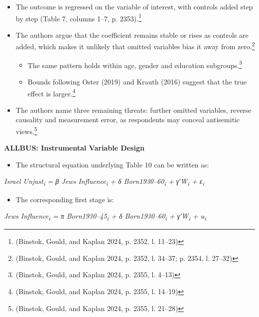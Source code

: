 \begin{itemize}
\item
  The outcome is regressed on the variable of interest, with controls added step by step (Table 7, columns 1--7, p. 2353).\footnote{(Binstok, Gould, and Kaplan 2024, p. 2352, l. 11--23)}
\item
  The authors argue that the coefficient remains stable or rises as controls are added, which makes it unlikely that omitted variables bias it away from zero.\footnote{(Binstok, Gould, and Kaplan 2024, p. 2352, l. 34--37; p. 2354, l. 27--32)}

  \begin{itemize}
  \item
    The same pattern holds within age, gender and education subgroups.\footnote{(Binstok, Gould, and Kaplan 2024, p. 2355, l. 4--13)}
  \item
    Bounds following Oster (2019) and Krauth (2016) suggest that the true effect is larger.\footnote{(Binstok, Gould, and Kaplan 2024, p. 2355, l. 14--19)}
  \end{itemize}
\item
  The authors name three remaining threats: further omitted variables, reverse causality and measurement error, as respondents may conceal antisemitic views.\footnote{(Binstok, Gould, and Kaplan 2024, p. 2355, l. 21--28)}
\end{itemize}

\par\textbf{ALLBUS: Instrumental Variable Design}\par

\begin{itemize}
\item
  The structural equation underlying Table 10 can be written as:
\end{itemize}

\emph{Israel Unjust\textsubscript{i} = β Jews Influence\textsubscript{i} + δ Born1930--60\textsubscript{i} + γ′W\textsubscript{i} + ε\textsubscript{i}}

\begin{itemize}
\item
  The corresponding first stage is:
\end{itemize}

\emph{Jews Influence\textsubscript{i} = π Born1930--45\textsubscript{i} + δ Born1930--60\textsubscript{i} + γ′W\textsubscript{i} + u\textsubscript{i}}

